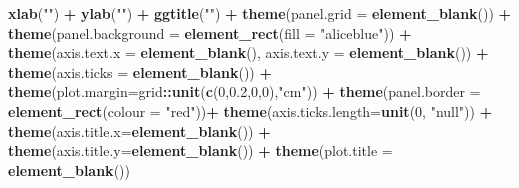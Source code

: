 \documentclass[12pt,oneside]{reedthesis}
\newenvironment{Shaded}{\begin{snugshade}}{\end{snugshade}}
\newcommand{\DataTypeTok}[1]{\textcolor[rgb]{0.13,0.29,0.53}{#1}}
\newcommand{\DecValTok}[1]{\textcolor[rgb]{0.00,0.00,0.81}{#1}}
\newcommand{\FloatTok}[1]{\textcolor[rgb]{0.00,0.00,0.81}{#1}}
\newcommand{\KeywordTok}[1]{\textcolor[rgb]{0.13,0.29,0.53}{\textbf{#1}}}
\newcommand{\NormalTok}[1]{#1}
\newcommand{\OperatorTok}[1]{\textcolor[rgb]{0.81,0.36,0.00}{\textbf{#1}}}
\newcommand{\StringTok}[1]{\textcolor[rgb]{0.31,0.60,0.02}{#1}}
\begin{document}
\begin{Shaded}
\begin{Highlighting}[]
\StringTok{  }\KeywordTok{xlab}\NormalTok{(}\StringTok{""}\NormalTok{) }\OperatorTok{+}\StringTok{ }
\StringTok{  }\KeywordTok{ylab}\NormalTok{(}\StringTok{""}\NormalTok{) }\OperatorTok{+}\StringTok{ }
\StringTok{  }\KeywordTok{ggtitle}\NormalTok{(}\StringTok{""}\NormalTok{) }\OperatorTok{+}
\StringTok{  }\KeywordTok{theme}\NormalTok{(}\DataTypeTok{panel.grid =} \KeywordTok{element_blank}\NormalTok{()) }\OperatorTok{+}\StringTok{ }
\StringTok{  }\KeywordTok{theme}\NormalTok{(}\DataTypeTok{panel.background =} \KeywordTok{element_rect}\NormalTok{(}\DataTypeTok{fill =} \StringTok{"aliceblue"}\NormalTok{)) }\OperatorTok{+}
\StringTok{  }\KeywordTok{theme}\NormalTok{(}\DataTypeTok{axis.text.x =} \KeywordTok{element_blank}\NormalTok{(), }\DataTypeTok{axis.text.y =} \KeywordTok{element_blank}\NormalTok{()) }\OperatorTok{+}
\StringTok{  }\KeywordTok{theme}\NormalTok{(}\DataTypeTok{axis.ticks =} \KeywordTok{element_blank}\NormalTok{()) }\OperatorTok{+}
\StringTok{  }\KeywordTok{theme}\NormalTok{(}\DataTypeTok{plot.margin=}\NormalTok{grid}\OperatorTok{::}\KeywordTok{unit}\NormalTok{(}\KeywordTok{c}\NormalTok{(}\DecValTok{0}\NormalTok{,}\FloatTok{0.2}\NormalTok{,}\DecValTok{0}\NormalTok{,}\DecValTok{0}\NormalTok{),}\StringTok{"cm"}\NormalTok{)) }\OperatorTok{+}\StringTok{ }
\StringTok{  }\KeywordTok{theme}\NormalTok{(}\DataTypeTok{panel.border =} \KeywordTok{element_rect}\NormalTok{(}\DataTypeTok{colour =} \StringTok{"red"}\NormalTok{))}\OperatorTok{+}
\StringTok{  }\KeywordTok{theme}\NormalTok{(}\DataTypeTok{axis.ticks.length=}\KeywordTok{unit}\NormalTok{(}\DecValTok{0}\NormalTok{, }\StringTok{"null"}\NormalTok{)) }\OperatorTok{+}
\StringTok{  }\KeywordTok{theme}\NormalTok{(}\DataTypeTok{axis.title.x=}\KeywordTok{element_blank}\NormalTok{()) }\OperatorTok{+}
\StringTok{  }\KeywordTok{theme}\NormalTok{(}\DataTypeTok{axis.title.y=}\KeywordTok{element_blank}\NormalTok{()) }\OperatorTok{+}
\StringTok{  }\KeywordTok{theme}\NormalTok{(}\DataTypeTok{plot.title =} \KeywordTok{element_blank}\NormalTok{())}
  

\end{Highlighting}
\end{Shaded}
\end{document}
